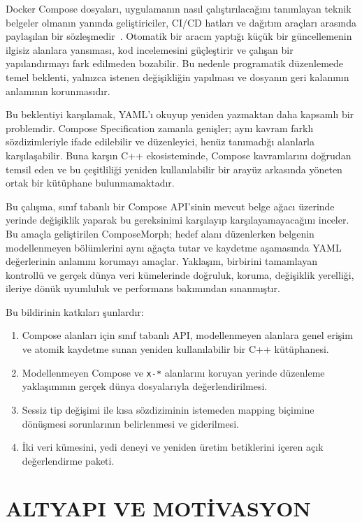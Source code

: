 \documentclass[12pt,a4paper]{article}
\begin{document}
Docker Compose dosyaları, uygulamanın nasıl çalıştırılacağını tanımlayan teknik belgeler olmanın yanında geliştiriciler, CI/CD hatları ve dağıtım araçları arasında paylaşılan bir sözleşmedir~\cite{composespec,ibrahim2021dockercompose}. Otomatik bir aracın yaptığı küçük bir güncellemenin ilgisiz alanlara yansıması, kod incelemesini güçleştirir ve çalışan bir yapılandırmayı fark edilmeden bozabilir. Bu nedenle programatik düzenlemede temel beklenti, yalnızca istenen değişikliğin yapılması ve dosyanın geri kalanının anlamının korunmasıdır.

Bu beklentiyi karşılamak, YAML'ı okuyup yeniden yazmaktan daha kapsamlı bir problemdir. Compose Specification zamanla genişler; aynı kavram farklı sözdizimleriyle ifade edilebilir ve düzenleyici, henüz tanımadığı alanlarla karşılaşabilir. Buna karşın C++ ekosisteminde, Compose kavramlarını doğrudan temsil eden ve bu çeşitliliği yeniden kullanılabilir bir arayüz arkasında yöneten ortak bir kütüphane bulunmamaktadır.

Bu çalışma, sınıf tabanlı bir Compose API'sinin mevcut belge ağacı üzerinde yerinde değişiklik yaparak bu gereksinimi karşılayıp karşılayamayacağını inceler. Bu amaçla geliştirilen ComposeMorph; hedef alanı düzenlerken belgenin modellenmeyen bölümlerini aynı ağaçta tutar ve kaydetme aşamasında YAML değerlerinin anlamını korumayı amaçlar. Yaklaşım, birbirini tamamlayan kontrollü ve gerçek dünya veri kümelerinde doğruluk, koruma, değişiklik yerelliği, ileriye dönük uyumluluk ve performans bakımından sınanmıştır.

Bu bildirinin katkıları şunlardır:
\begin{enumerate}
  \item Compose alanları için sınıf tabanlı API, modellenmeyen alanlara genel
    erişim ve atomik kaydetme sunan yeniden kullanılabilir bir C++ kütüphanesi.
  \item Modellenmeyen Compose ve \texttt{x-*} alanlarını koruyan yerinde
    düzenleme yaklaşımının gerçek dünya dosyalarıyla değerlendirilmesi.
  \item Sessiz tip değişimi ile kısa sözdiziminin istemeden mapping biçimine
    dönüşmesi sorunlarının belirlenmesi ve giderilmesi.
  \item İki veri kümesini, yedi deneyi ve yeniden üretim betiklerini içeren
    açık değerlendirme paketi.
\end{enumerate}

\section{ALTYAPI VE MOTİVASYON}
\label{sec:altyapi}
\end{document}
